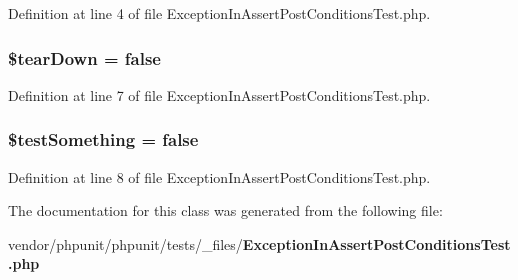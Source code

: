 Definition at line 4 of file Exception\+In\+Assert\+Post\+Conditions\+Test.\+php.

\subsubsection[{\$tear\+Down}]{\setlength{\rightskip}{0pt plus 5cm}\${\bf tear\+Down} = false}\label{class_exception_in_assert_post_conditions_test_a9639b8e6f680299142ffe313f876712f}


Definition at line 7 of file Exception\+In\+Assert\+Post\+Conditions\+Test.\+php.

\subsubsection[{\$test\+Something}]{\setlength{\rightskip}{0pt plus 5cm}\${\bf test\+Something} = false}\label{class_exception_in_assert_post_conditions_test_a25acbdb5bf8dc30b31f537d60bfb02f5}


Definition at line 8 of file Exception\+In\+Assert\+Post\+Conditions\+Test.\+php.



The documentation for this class was generated from the following file\+:\begin{DoxyCompactItemize}
\item 
vendor/phpunit/phpunit/tests/\+\_\+files/{\bf Exception\+In\+Assert\+Post\+Conditions\+Test.\+php}\end{DoxyCompactItemize}
